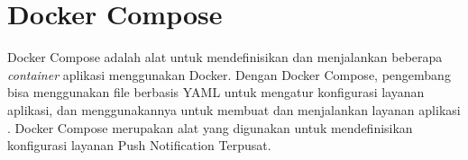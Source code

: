 \section{Docker Compose}
\par Docker Compose adalah alat untuk mendefinisikan dan menjalankan beberapa \textit{container} aplikasi menggunakan Docker. Dengan Docker Compose, pengembang bisa menggunakan file berbasis YAML untuk mengatur konfigurasi layanan aplikasi, dan menggunakannya untuk membuat dan menjalankan layanan aplikasi \cite{docker-compose-online}. Docker Compose merupakan alat yang digunakan untuk mendefinisikan konfigurasi layanan Push Notification Terpusat.
